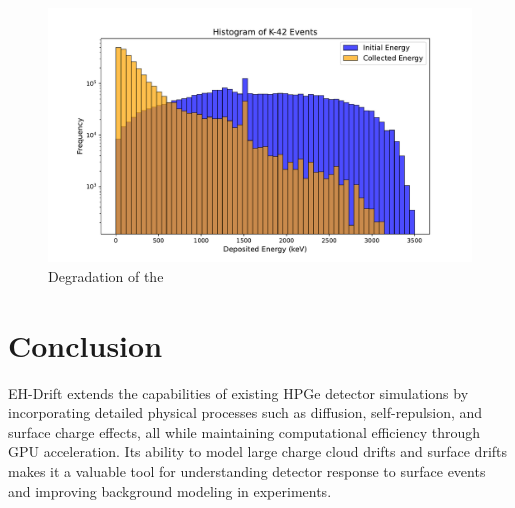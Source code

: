 \begin{figure}[!htb]
  \centering
  \includegraphics[trim={1.5cm 0.0cm 2cm 0cm},clip,width=0.99\linewidth]{ch5/figs/k_42_beta_spectrum.pdf}
  \caption{Degradation of the }
  \label{ch5:figs:k_42_degrad}
\end{figure}




\section{Conclusion}
EH-Drift extends the capabilities of existing HPGe detector simulations by incorporating detailed physical processes such as diffusion, self-repulsion, and surface charge effects, all while maintaining computational efficiency through GPU acceleration. Its ability to model large charge cloud drifts and surface drifts makes it a valuable tool for understanding detector response to surface events and improving background modeling in experiments.
